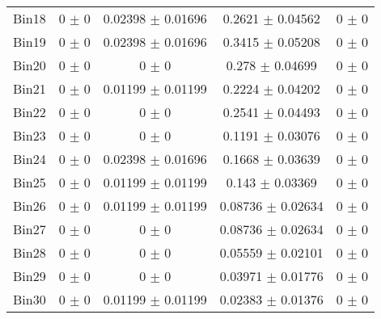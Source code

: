 \begin{tabular}{@{\extracolsep{4pt}}lcccc@{}}
     Bin18 & 0 $\pm$ 0 & 0.02398 $\pm$ 0.01696 & 0.2621 $\pm$ 0.04562 & 0 $\pm$ 0 \\ 
     Bin19 & 0 $\pm$ 0 & 0.02398 $\pm$ 0.01696 & 0.3415 $\pm$ 0.05208 & 0 $\pm$ 0 \\ 
     Bin20 & 0 $\pm$ 0 & 0 $\pm$ 0 & 0.278 $\pm$ 0.04699 & 0 $\pm$ 0 \\ 
     Bin21 & 0 $\pm$ 0 & 0.01199 $\pm$ 0.01199 & 0.2224 $\pm$ 0.04202 & 0 $\pm$ 0 \\ 
     Bin22 & 0 $\pm$ 0 & 0 $\pm$ 0 & 0.2541 $\pm$ 0.04493 & 0 $\pm$ 0 \\ 
     Bin23 & 0 $\pm$ 0 & 0 $\pm$ 0 & 0.1191 $\pm$ 0.03076 & 0 $\pm$ 0 \\ 
     Bin24 & 0 $\pm$ 0 & 0.02398 $\pm$ 0.01696 & 0.1668 $\pm$ 0.03639 & 0 $\pm$ 0 \\ 
     Bin25 & 0 $\pm$ 0 & 0.01199 $\pm$ 0.01199 & 0.143 $\pm$ 0.03369 & 0 $\pm$ 0 \\ 
     Bin26 & 0 $\pm$ 0 & 0.01199 $\pm$ 0.01199 & 0.08736 $\pm$ 0.02634 & 0 $\pm$ 0 \\ 
     Bin27 & 0 $\pm$ 0 & 0 $\pm$ 0 & 0.08736 $\pm$ 0.02634 & 0 $\pm$ 0 \\ 
     Bin28 & 0 $\pm$ 0 & 0 $\pm$ 0 & 0.05559 $\pm$ 0.02101 & 0 $\pm$ 0 \\ 
     Bin29 & 0 $\pm$ 0 & 0 $\pm$ 0 & 0.03971 $\pm$ 0.01776 & 0 $\pm$ 0 \\ 
     Bin30 & 0 $\pm$ 0 & 0.01199 $\pm$ 0.01199 & 0.02383 $\pm$ 0.01376 & 0 $\pm$ 0 \\ 
\hline\hline
  \end{tabular}
